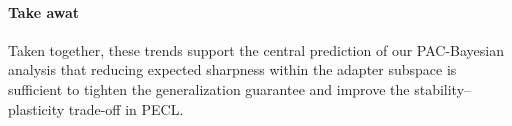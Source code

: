 \documentclass{article}
\theoremstyle{plain}
\theoremstyle{definition}
\theoremstyle{remark}
\begin{document}
\paragraph{Take awat}

Taken together, these trends support the central prediction of our PAC-Bayesian analysis that reducing expected sharpness within the adapter subspace is sufficient to tighten the generalization guarantee and improve the stability–plasticity trade-off in PECL.












\end{document}
